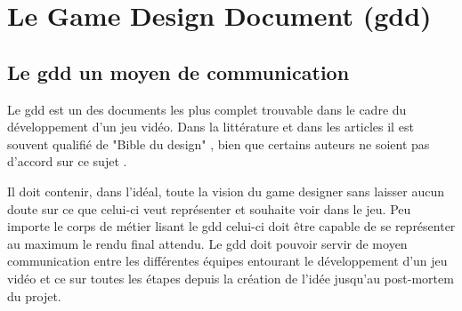\section{Le Game Design Document (\gls{gdd})}





\subsection{Le \gls{gdd} un moyen de communication}
Le \gls{gdd} est un des documents les plus complet trouvable dans le cadre du développement d'un jeu vidéo. Dans la littérature et dans les articles il est souvent qualifié de "Bible du design" \cite{GD_foundations_pedersen}, bien que certains auteurs ne soient pas d'accord sur ce sujet \cite{LevelUpRogers2014}. 

Il doit contenir, dans l'idéal, toute la vision du game designer sans laisser aucun doute sur ce que celui-ci veut représenter et souhaite voir dans le jeu. Peu importe le corps de métier lisant le \gls{gdd} celui-ci doit être capable de se représenter au maximum le rendu final attendu. Le \gls{gdd} doit pouvoir servir de moyen communication entre les différentes équipes entourant le développement d'un jeu vidéo et ce sur toutes les étapes depuis la création de l'idée jusqu'au post-mortem du projet.

